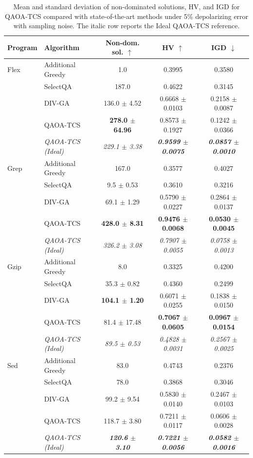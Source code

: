 \begin{table}[t]
\centering
\scriptsize
\setlength{\tabcolsep}{3pt}
\caption{Mean and standard deviation of non-dominated solutions, HV, and IGD for QAOA-TCS compared with state-of-the-art methods under 5\% depolarizing error with sampling noise. The italic row reports the Ideal QAOA-TCS reference.}
\label{tab:noise5_means}
\begin{tabular}{llccc}
\toprule
\textbf{Program} & \textbf{Algorithm} & \textbf{Non-dom. sol.} $\uparrow$ & \textbf{HV} $\uparrow$ & \textbf{IGD} $\downarrow$ \\
\midrule
Flex & Additional Greedy & 1.0 & 0.3995 & 0.3580 \\
 & SelectQA & 187.0 & 0.4622 & 0.3145 \\
 & DIV-GA & 136.0 $\pm$ 4.52 & 0.6668 $\pm$ 0.0103 & 0.2158 $\pm$ 0.0087 \\
 & QAOA-TCS & \textbf{278.0 $\pm$ 64.96} & 0.8573 $\pm$ 0.1927 & 0.1242 $\pm$ 0.0366 \\
 & \textit{QAOA-TCS (Ideal)} & \textit{229.1 $\pm$ 3.38} & \textbf{\textit{0.9599 $\pm$ 0.0075}} & \textbf{\textit{0.0857 $\pm$ 0.0010}} \\
\midrule
Grep & Additional Greedy & 167.0 & 0.3577 & 0.4027 \\
 & SelectQA & 9.5 $\pm$ 0.53 & 0.3610 & 0.3216 \\
 & DIV-GA & 69.1 $\pm$ 1.29 & 0.5790 $\pm$ 0.0227 & 0.2864 $\pm$ 0.0137 \\
 & QAOA-TCS & \textbf{428.0 $\pm$ 8.31} & \textbf{0.9476 $\pm$ 0.0068} & \textbf{0.0530 $\pm$ 0.0045} \\
 & \textit{QAOA-TCS (Ideal)} & \textit{326.2 $\pm$ 3.08} & \textit{0.7907 $\pm$ 0.0055} & \textit{0.0758 $\pm$ 0.0013} \\
\midrule
Gzip & Additional Greedy & 8.0 & 0.3325 & 0.4200 \\
 & SelectQA & 35.3 $\pm$ 0.82 & 0.4360 & 0.2499 \\
 & DIV-GA & \textbf{104.1 $\pm$ 1.20} & 0.6071 $\pm$ 0.0255 & 0.1838 $\pm$ 0.0150 \\
 & QAOA-TCS & 81.4 $\pm$ 17.48 & \textbf{0.7067 $\pm$ 0.0605} & \textbf{0.0967 $\pm$ 0.0154} \\
 & \textit{QAOA-TCS (Ideal)} & \textit{89.5 $\pm$ 0.53} & \textit{0.4828 $\pm$ 0.0031} & \textit{0.2567 $\pm$ 0.0025} \\
\midrule
Sed & Additional Greedy & 83.0 & 0.4743 & 0.2376 \\
 & SelectQA & 78.0 & 0.3868 & 0.3046 \\
 & DIV-GA & 99.2 $\pm$ 9.54 & 0.5830 $\pm$ 0.0140 & 0.2467 $\pm$ 0.0103 \\
 & QAOA-TCS & 118.7 $\pm$ 3.80 & 0.7211 $\pm$ 0.0117 & 0.0606 $\pm$ 0.0028 \\
 & \textit{QAOA-TCS (Ideal)} & \textbf{\textit{120.6 $\pm$ 3.10}} & \textbf{\textit{0.7221 $\pm$ 0.0056}} & \textbf{\textit{0.0582 $\pm$ 0.0016}} \\
\bottomrule
\end{tabular}%
\end{table}

